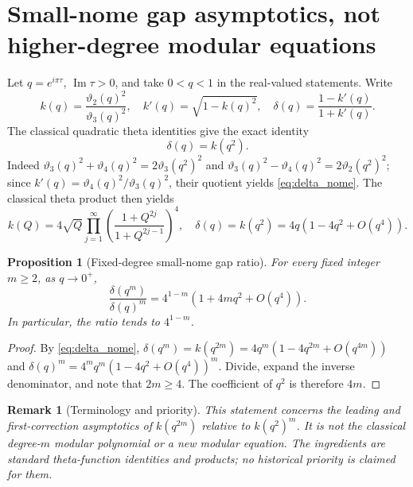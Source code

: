 \documentclass[11pt]{article}
\newtheorem{proposition}{Proposition}
\newtheorem{remark}{Remark}
\begin{document}
\section{Small-nome gap asymptotics, not higher-degree modular equations}
Let $q=e^{i\pi\tau}$, $\operatorname{Im}\tau>0$, and take $0<q<1$ in the real-valued statements. Write
\[
k(q)=\frac{\vartheta_2(q)^2}{\vartheta_3(q)^2},\quad
k'(q)=\sqrt{1-k(q)^2},\quad
\delta(q)=\frac{1-k'(q)}{1+k'(q)}.
\]
The classical quadratic theta identities give the exact identity
\begin{equation}\label{eq:delta_nome}
\boxed{\delta(q)=k(q^2).}
\end{equation}
Indeed $\vartheta_3(q)^2+\vartheta_4(q)^2=2\vartheta_3(q^2)^2$ and
$\vartheta_3(q)^2-\vartheta_4(q)^2=2\vartheta_2(q^2)^2$; since $k'(q)=\vartheta_4(q)^2/\vartheta_3(q)^2$, their quotient yields \eqref{eq:delta_nome}.
The classical theta product then yields
\[
k(Q)=4\sqrt{Q}\prod_{j=1}^\infty\left(\frac{1+Q^{2j}}{1+Q^{2j-1}}\right)^4,
\quad\delta(q)=k(q^2)=4q\left(1-4q^2+O(q^4)\right).
\]
\begin{proposition}[Fixed-degree small-nome gap ratio]\label{prop:gap}
For every \emph{fixed} integer $m\ge2$, as $q\to0^+$,
\[
\boxed{\frac{\delta(q^m)}{\delta(q)^m}
=4^{1-m}\left(1+4m q^2+O(q^4)\right).}
\]
In particular, the ratio tends to $4^{1-m}$.
\end{proposition}
\begin{proof}
By \eqref{eq:delta_nome}, $\delta(q^m)=k(q^{2m})=4q^m(1-4q^{2m}+O(q^{4m}))$ and $\delta(q)^m=4^mq^m(1-4q^2+O(q^4))^m$. Divide, expand the inverse denominator, and note that $2m\ge4$. The coefficient of $q^2$ is therefore $4m$.
\end{proof}
\begin{remark}[Terminology and priority]
This statement concerns the leading and first-correction asymptotics of $k(q^{2m})$ relative to $k(q^2)^m$. It is \emph{not} the classical degree-$m$ modular polynomial or a new modular equation. The ingredients are standard theta-function identities and products; no historical priority is claimed for them.
\end{remark}
\end{document}
